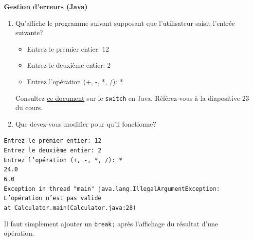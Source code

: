 \begin{Exercice}[5 minutes] \textbf{Gestion d'erreurs (Java)} 
    \begin{enumerate}
    \item Qu'affiche le programme suivant supposant que l'utilisateur saisit l'entrée suivante? \\

    \begin{itemize}
        \item Entrez le premier entier: 12
        \item Entrez le deuxième entier: 2
        \item Entrez l'opération (+, -, *, /): *
    \end{itemize}

    \begin{conseil}
            Consultez \href{https://moodle.unil.ch/pluginfile.php/3705947/mod_resource/content/8/jswitch.pdf}{ce document} sur le \texttt{switch} en Java. Référez-vous à la diapositive 23 du cours. 
     \end{conseil}

     \item Que devez-vous modifier pour qu'il fonctionne?
    \end{enumerate}
    
    \begin{solution}
    \texttt{Entrez le premier entier: 12 \\ 
Entrez le deuxième entier: 2 \\
Entrez l'opération (+, -, *, /): * \\ 
24.0\\
6.0\\
Exception in thread "main" java.lang.IllegalArgumentException: L'opération n'est pas valide \\
        at Calculator.main(Calculator.java:28)}
    \end{solution}
\begin{solution}
Il faut simplement ajouter un \texttt{break;} après l'affichage du résultat d'une opération. 
\end{solution}

 \end{Exercice}

